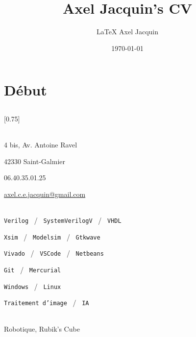 \documentclass[pastel]{simplehipstercv}
\title{Axel Jacquin's CV}
\author{\LaTeX{} Axel Jacquin}
\date{\today}
\begin{document}
\thispagestyle{empty}

\section*{Début}


\subsection*{}
\vspace{4em}

\setlength{\columnsep}{1.5cm}
[0.75]
\begin{paracol}{2}

\paracolbackgroundoptions

\footnotesize
{\setasidefontcolour
\flushright

\begin{center}
\end{center}

 \\[0.5em]

 4 bis, Av. Antoine Ravel

 42330 Saint-Galmier

 06.40.35.01.25 

\protect\url{axel.c.e.jacquin@gmail.com}

\bigskip

\\[0.5em]

\texttt{Verilog} ~/~ \texttt{SystemVerilogV} ~/~ \texttt{VHDL}

\texttt{Xsim} ~/~ \texttt{Modelsim} ~/~ \texttt{Gtkwave}

\texttt{Vivado} ~/~ \texttt{VSCode} ~/~ \texttt{Netbeans}

\texttt{Git} ~/~ \texttt{Mercurial}

\texttt{Windows} ~/~ \texttt{Linux}

\texttt{Traitement d'image} ~/~ \texttt{IA}

\bigskip

\\[0.5em]

Robotique, Rubik’s Cube

}
\end{paracol}
\end{document}
